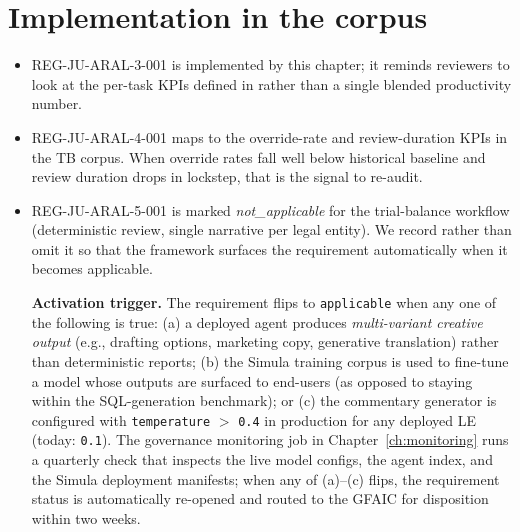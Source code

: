\section{Implementation in the corpus}

\begin{itemize}
  \item REG-JU-ARAL-3-001 is implemented by this chapter; it reminds
        reviewers to look at the per-task KPIs defined in
         rather than a single
        blended productivity number.
  \item REG-JU-ARAL-4-001 maps to the override-rate and review-duration
        KPIs in the TB corpus. When override rates fall well below
        historical baseline and review duration drops in lockstep, that
        is the signal to re-audit.
  \item REG-JU-ARAL-5-001 is marked \emph{not\_applicable} for the
        trial-balance workflow (deterministic review, single narrative
        per legal entity). We record rather than omit it so that the
        framework surfaces the requirement automatically when it
        becomes applicable.

        \textbf{Activation trigger.} The requirement flips to
        \texttt{applicable} when any one of the following is true:
        (a) a deployed agent produces \emph{multi-variant creative
        output} (e.g., drafting options, marketing copy, generative
        translation) rather than deterministic reports; (b) the
        Simula training corpus is used to fine-tune a model whose
        outputs are surfaced to end-users (as opposed to staying
        within the SQL-generation benchmark); or (c) the
        commentary generator is configured with
        \texttt{temperature} $>$ \texttt{0.4} in production for any
        deployed LE (today: \texttt{0.1}). The governance
        monitoring job in Chapter~\ref{ch:monitoring} runs a
        quarterly check that inspects the live model configs, the
        agent index, and the Simula deployment manifests; when any
        of (a)--(c) flips, the requirement status is automatically
        re-opened and routed to the GFAIC for disposition within
        two weeks.
\end{itemize}
\clearpage
